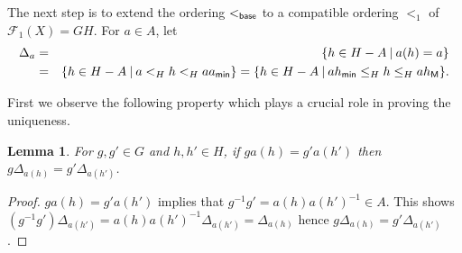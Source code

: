 \documentclass[10pt]{amsart}
\newtheorem{lemma}[theorem]{Lemma}
\numberwithin{equation}{section}
\begin{document}
The next step is to extend the ordering $<_{\sf base}$ to a compatible ordering $<_{1}$ of ${\mathcal{F}}_{1}(X)=GH$. For $a \in A$, let 
\begin{eqnarray*}
\Delta_{a} &= & \{h \in H-A \: | \: a(h)=a\} \\
& = & \{h \in H-A \: | \: a <_{H} h <_{H} aa_{\sf min} \} = \{h \in H-A \: | \: ah_{\sf min} \leq_{H} h \leq_{H} ah_{\sf M}\}.
\end{eqnarray*}

First we observe the following property which plays a crucial role in proving the uniqueness.

\begin{lemma}
\label{lemma:key0}
For $g,g' \in G$ and $h,h' \in H$, if $ga(h)=g'a(h')$ then  $g\Delta_{a(h)}=g'\Delta_{a(h')}$.
\end{lemma}
\begin{proof}
$ga(h)=g'a(h')$ implies that $g^{-1}g' = a(h)a(h')^{-1} \in A$.
This shows $(g^{-1}g') \Delta_{a(h')} = a(h)a(h')^{-1}\Delta_{a(h')} = \Delta_{a(h)}$ hence $g\Delta_{a(h)}=g'\Delta_{a(h')}$.
\end{proof}
\end{document}
